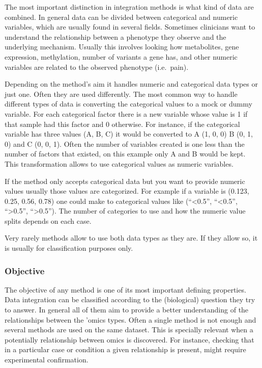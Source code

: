 \documentclass[
  a4paper,
]{book}
\begin{document}
The most important distinction in integration methods is what kind of data are combined.
In general data can be divided between categorical and numeric variables, which are usually found in several fields.
Sometimes clinicians want to understand the relationship between a phenotype they observe and the underlying mechanism.
Usually this involves looking how metabolites, gene expression, methylation, number of variants a gene has, and other numeric variables are related to the observed phenotype (i.e.~pain).

Depending on the method's aim it handles numeric and categorical data types or just one.
Often they are used differently.
The most common way to handle different types of data is converting the categorical values to a mock or dummy variable.
For each categorical factor there is a new variable whose value is 1 if that sample had this factor and 0 otherwise.
For instance, if the categorical variable has three values (A, B, C) it would be converted to A (1, 0, 0) B (0, 1, 0) and C (0, 0, 1).
Often the number of variables created is one less than the number of factors that existed, on this example only A and B would be kept.
This transformation allows to use categorical values as numeric variables.

If the method only accepts categorical data but you want to provide numeric values usually those values are categorized.
For example if a variable is (0.123, 0.25, 0.56, 0.78) one could make to categorical values like (``\textless0.5'', ``\textless0.5'', ``\textgreater0.5'', ``\textgreater0.5'').
The number of categories to use and how the numeric value splits depends on each case.

Very rarely methods allow to use both data types as they are.
If they allow so, it is usually for classification purposes only.

\hypertarget{objective}{%
\subsubsection{Objective}\label{objective}}

The objective of any method is one of its most important defining properties.
Data integration can be classified according to the (biological) question they try to answer.
In general all of them aim to provide a better understanding of the relationships between the 'omics types.
Often a single method is not enough and several methods are used on the same dataset.
This is specially relevant when a potentially relationship between omics is discovered.
For instance, checking that in a particular case or condition a given relationship is present, might require experimental confirmation.
\end{document}

